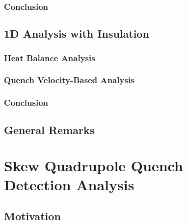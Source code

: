 \documentclass{article}
\begin{document}
\subsubsection{Conclusion}


\subsection{1D Analysis with Insulation}
\label{subsection:quench_velocity_benchmarking_with_insulation}

\subsubsection{Heat Balance Analysis}
\label{subsection:quench_velocity_benchmarking_with_insulation_heat_balance}


\subsubsection{Quench Velocity-Based Analysis}
\label{subsection:quench_velocity_benchmarking_with_insulation_quench_velocity}


\subsubsection{Conclusion}


\subsection{General Remarks}


\clearpage
\section{Skew Quadrupole Quench Detection Analysis}
\label{section:skew_quadrupole_quench_detection_analysis}

\subsection{Motivation}

\end{document}

